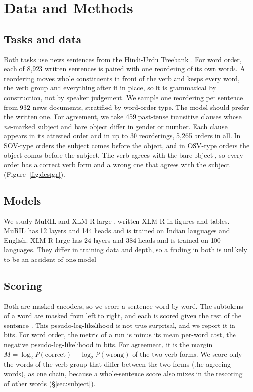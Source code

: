 \documentclass[11pt]{article}
\begin{document}
\section{Data and Methods}
\label{sec:methods}

\subsection{Tasks and data}
Both tasks use news sentences from the Hindi-Urdu Treebank \citep{bhatt2009}.
For word order, each of 8,923 written sentences is paired with one reordering of its own words.
A reordering moves whole constituents in front of the verb and keeps every word, the verb group and everything after it in place, so it is grammatical by construction, not by speaker judgement.
We sample one reordering per sentence from 932 news documents, stratified by word-order type.
The model should prefer the written one.
For agreement, we take 459 past-tense transitive clauses whose \emph{ne}-marked subject and bare object differ in gender or number.
Each clause appears in its attested order and in up to 30 reorderings, 5,265 orders in all.
In SOV-type orders the subject comes before the object, and in OSV-type orders the object comes before the subject.
The verb agrees with the bare object \citep{mohanan1994}, so every order has a correct verb form and a wrong one that agrees with the subject (Figure~\ref{fig:design}).

\subsection{Models}
We study MuRIL \citep{khanuja2021} and XLM-R-large \citep{conneau2020}, written XLM-R in figures and tables.
MuRIL has 12 layers and 144 heads and is trained on Indian languages and English.
XLM-R-large has 24 layers and 384 heads and is trained on 100 languages.
They differ in training data and depth, so a finding in both is unlikely to be an accident of one model.

\subsection{Scoring}
Both are masked encoders, so we score a sentence word by word.
The subtokens of a word are masked from left to right, and each is scored given the rest of the sentence \citep{kauf2023}.
This pseudo-log-likelihood is not true surprisal, and we report it in bits.
For word order, the metric of a run is minus its mean per-word cost, the negative pseudo-log-likelihood in bits.
For agreement, it is the margin $M=\log_2 P(\text{correct})-\log_2 P(\text{wrong})$ of the two verb forms.
We score only the words of the verb group that differ between the two forms (the agreeing words), as one chain, because a whole-sentence score also mixes in the rescoring of other words (\S\ref{sec:subject}).
\end{document}
